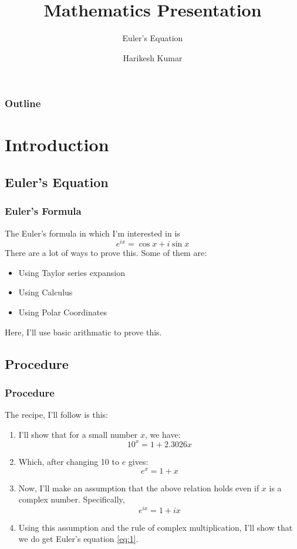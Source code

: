 \documentclass{beamer}
\title{Mathematics Presentation}
\subtitle{Euler's Equation}
\institute[IITD]{Indian Institute of Technology, Delhi}
\author{Harikesh Kumar}
\begin{document}
\maketitle
\begin{frame}
\frametitle{Outline}
\tableofcontents
\end{frame}
\label{Intro}
\section{Introduction}
\subsection{Euler's Equation}
\begin{frame}
\frametitle{Euler's Formula}
The Euler's formula in which I'm interested in is
\begin{equation}
    \label{eq:1}
        e^{ix} = \cos{x} + i\sin{x}
\end{equation}
There are a lot of ways to prove this. Some of them are:
\begin{itemize}
\color{blue}
\item <2-> Using Taylor series expansion
\item <3-> Using Calculus
\item <4-> Using Polar Coordinates
\end{itemize}
 Here, I'll use basic arithmatic to prove this.
\end{frame}
\subsection{Procedure}
\begin{frame}
    \frametitle{Procedure}
    The recipe, I'll follow is this:
    \begin{enumerate}
        \item <2->  I'll show that for a small number $x$, we have: $$ 10^x = 1 + 2.3026x$$
        \item <3-> Which, after changing 10 to $e$ gives: $$ e^x = 1+x$$
        \item <4-> Now, I'll make an assumption that the above relation holds even if $x$ is a complex number. Specifically, $$e^{ix} = 1+ix$$
        \item <5-> Using this assumption and the rule of complex multiplication, I'll show that we do get Euler's equation \ref{eq:1}.
    \end{enumerate}
\end{frame}
\end{document}
